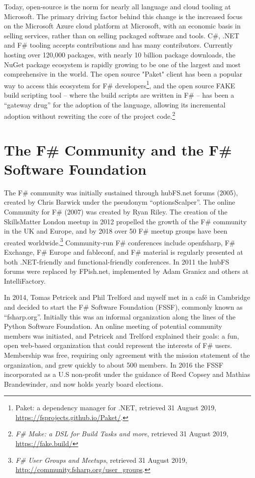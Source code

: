 \documentclass[acmsmall,review]{acmart}\settopmatter{printfolios=true,printccs=false,printacmref=false}
\begin{document}
Today, open-source is the norm for nearly all language and cloud tooling at Microsoft. The primary driving factor
behind this change is the increased focus on the Microsoft Azure cloud platform at Microsoft, with an economic basis in
selling services, rather than on selling packaged software and tools. C\#, .NET and F\# tooling accepts contributions and
has many contributors. Currently hosting over 120,000 packages, with nearly 10 billion package downloads, the NuGet
package ecosystem is rapidly growing to be one of the largest and most comprehensive in the world.  The open source "Paket"
client has been a popular way to access this ecosystem for F\#
developers\footnote{Paket: a dependency manager for .NET, retrieved 31 August 2019, \url{https://fsprojects.github.io/Paket/}.}, and
the open source FAKE build scripting tool – where the build scripts are written in F\# – has been a “gateway drug” for the adoption of the language, allowing its
incremental adoption without rewriting the core of the project code.\footnote{\textit{F\# Make: a DSL for Build Tasks and more}, retrieved 31 August 2019, \url{https://fake.build/}}



\section*{The F\# Community and the F\# Software Foundation }

The F\# community was initially sustained through hubFS.net forums (2005), created by Chris Barwick under the
pseudonym “optionsScalper”. The online Community for F\# (2007) was created by Ryan Riley.  The creation of the
SkillsMatter London meetup in 2012 propelled the growth of the F\# community in the UK and Europe, and by 2018
over 50 F\# meetup groups have been created worldwide.\footnote{ \textit{F\# User Groups and Meetups}, retrieved 31 August 2019, \url{http://community.fsharp.org/user_groups}.}
Community-run F\# conferences include openfsharp, F\# Exchange, F\# Europe and fableconf, and F\# material is regularly presented at both .NET-friendly and functional-friendly conferences. In 2011 the hubFS forums were replaced by FPish.net, implemented by Adam Granicz and others at IntelliFactory. 

In 2014, Tomas Petricek and Phil Trelford and myself met in a café in Cambridge and decided to start the F\# Software
Foundation (FSSF), commonly known as “fsharp.org”.  Initially this was an informal organization along the lines of the Python
Software Foundation.  An online meeting of potential community members was initiated, and Petricek and Trelford explained
their goals: a fun, open web-based organization that could represent the interests of F\# users.  Membership was free,
requiring only agreement with the mission statement of the organization, and grew quickly to about 500 members.  In 2016 the
FSSF incorporated as a U.S non-profit under the guidance of Reed Copsey and Mathias Brandewinder, and now holds yearly board elections. 
\end{document}
